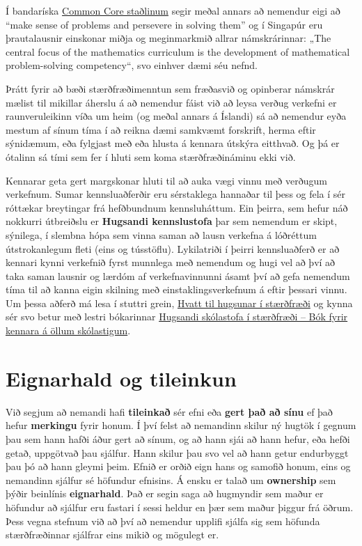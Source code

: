 \documentclass[
  icelandic,
]{book}
\begin{document}
Í bandaríska \href{https://www.thecorestandards.org/Math/Practice/}{Common Core staðlinum} segir meðal annars að nemendur eigi að ``make sense of problems and persevere in solving them'' og í Singapúr eru þrautalausnir einskonar miðja og meginmarkmið allrar námskrárinnar: „The central focus of the mathematics curriculum is the development of mathematical problem-solving competency``, svo einhver dæmi séu nefnd.

Þrátt fyrir að bæði stærðfræðimenntun sem fræðasvið og opinberar námskrár mælist til mikillar áherslu á að nemendur fáist við að leysa verðug verkefni er raunveruleikinn víða um heim (og meðal annars á Íslandi) sá að nemendur eyða mestum af sínum tíma í að reikna dæmi samkvæmt forskrift, herma eftir sýnidæmum, eða fylgjast með eða hlusta á kennara útskýra eitthvað. Og þá er ótalinn sá tími sem fer í hluti sem koma stærðfræðináminu ekki við.

Kennarar geta gert margskonar hluti til að auka vægi vinnu með verðugum verkefnum. Sumar kennsluaðferðir eru sérstaklega hannaðar til þess og fela í sér róttækar breytingar frá hefðbundnum kennsluháttum. Ein þeirra, sem hefur náð nokkurri útbreiðslu er \textbf{Hugsandi kennslustofa} þar sem nemendum er skipt, sýnilega, í slembna hópa sem vinna saman að lausn verkefna á lóðréttum útstrokanlegum fleti (eins og tússtöflu). Lykilatriði í þeirri kennsluaðferð er að kennari kynni verkefnið fyrst munnlega með nemendum og hugi vel að því að taka saman lausnir og lærdóm af verkefnavinnunni ásamt því að gefa nemendum tíma til að kanna eigin skilning með einstaklingsverkefnum á eftir þessari vinnu. Um þessa aðferð má lesa í stuttri grein, \href{https://skolathraedir.is/2019/11/15/hvatt-til-hugsunar-i-staerdfraedi/}{Hvatt til hugsunar í stærðfræði} og kynna sér svo betur með lestri bókarinnar \href{https://haskolautgafan.is/en/products/hugsandi-skolastofa-i-staerdfraedi-bok-fyrir-kennara-a-ollum-skolastigum}{Hugsandi skólastofa í stærðfræði -- Bók fyrir kennara á öllum skólastigum}.

\section{Eignarhald og tileinkun}\label{eignarhald}

Við segjum að nemandi hafi \textbf{tileinkað} sér efni eða \textbf{gert það að sínu} ef það hefur \textbf{merkingu} fyrir honum. Í því felst að nemandinn skilur ný hugtök í gegnum þau sem hann hafði áður gert að sínum, og að hann sjái að hann hefur, eða hefði getað, uppgötvað þau sjálfur. Hann skilur þau svo vel að hann getur endurbyggt þau þó að hann gleymi þeim. Efnið er orðið eign hans og samofið honum, eins og nemandinn sjálfur sé höfundur efnisins. Á ensku er talað um \textbf{ownership} sem þýðir beinlínis \textbf{eignarhald}. Það er segin saga að hugmyndir sem maður er höfundur að sjálfur eru fastari í sessi heldur en þær sem maður þiggur frá öðrum. Þess vegna stefnum við að því að nemendur upplifi sjálfa sig sem höfunda stærðfræðinnar sjálfrar eins mikið og mögulegt er.
\end{document}
